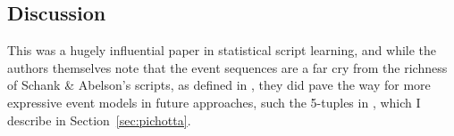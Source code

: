 \subsection{Discussion}
This was a hugely influential paper in statistical script learning, and while the authors themselves note that the event sequences are a far cry from the richness of Schank \& Abelson's scripts, as defined in \citep{schankandabelson}, they did pave the way for more expressive event models in future approaches, such the 5-tuples in \citep{pichotta2016learning}, which I describe in Section~\ref{sec:pichotta}.



